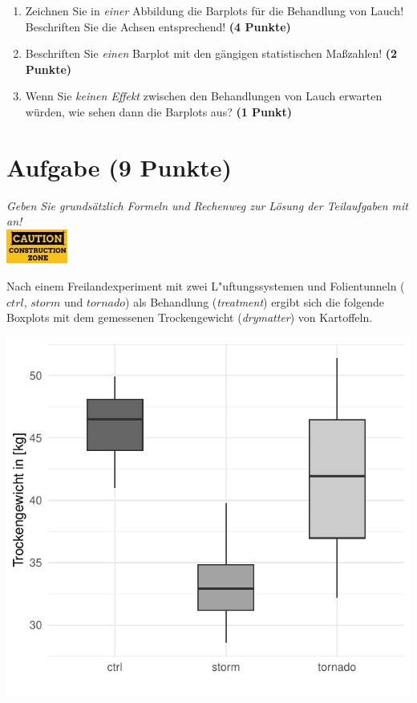 \documentclass[a4paper, 9pt]{scrartcl}\usepackage[]{graphicx}\usepackage[]{xcolor}
\makeatletter
\def\maxwidth{ %
  \ifdim\Gin@nat@width>\linewidth
    \linewidth
  \else
    \Gin@nat@width
  \fi
}
\makeatother
\begin{document}
\begin{enumerate}
\item Zeichnen Sie in \textit{einer} Abbildung die Barplots f{\"u}r die
  Behandlung von Lauch! Beschriften Sie die Achsen entsprechend!
  \textbf{(4 Punkte)}
\item Beschriften Sie \textit{einen} Barplot mit den g{\"a}ngigen
  statistischen Ma{\ss}zahlen! \textbf{(2 Punkte)}
\item Wenn Sie \textit{keinen Effekt} zwischen den Behandlungen von
  Lauch erwarten w{\"u}rden, wie sehen dann die Barplots aus?
  \textbf{(1 Punkt)}
\end{enumerate} 
\clearpage

\section{Aufgabe \hfill (9 Punkte)}

\textit{Geben Sie grunds{\"a}tzlich Formeln und Rechenweg zur L{\"o}sung der
  Teilaufgaben mit an!} \\[1Ex]

\hfill\href{}{\includegraphics[width = 2cm]{img/caution}} %
\hspace{2Ex}



Nach einem Freilandexperiment mit zwei L{"u}ftungssystemen und Folientunneln ($ctrl$, $storm$ und $tornado$) als Behandlung
(\textit{treatment}) ergibt sich die folgende Boxplots mit dem
gemessenen Trockengewicht (\textit{drymatter}) von Kartoffeln.



{\centering \includegraphics[width=\maxwidth]{img/boxplot-02-zer-1} 

}
\end{document}
